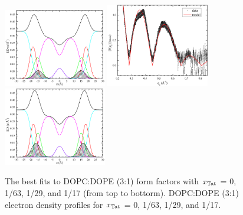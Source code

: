 \begin{figure}[htbp]
  \includegraphics[width=0.4\textwidth]{./figures/Tat/SDP_Results/EDP/DOPCDOPE3to1_Tat_28to1_3p0_EDP1}
  \includegraphics[width=0.4\textwidth]{figures/Tat/SDP_Results/XFF/DOPCDOPE3to1_Tat_16to1_3p0_XFF1}
  \includegraphics[width=0.4\textwidth]{./figures/Tat/SDP_Results/EDP/DOPCDOPE3to1_Tat_16to1_3p0_EDP1}
  \caption{The best fits to DOPC:DOPE (3:1) form factors with 
  $x_\textrm{Tat}$ = 0, 1/63, 1/29, and 1/17 (from top to bottorm). 
  DOPC:DOPE (3:1) electron density profiles for $x_\textrm{Tat}$ = 0, 1/63,
  1/29, and 1/17.}
  \label{fig:DOPCDOPE3to1_Tat_XFF1}
\end{figure}
